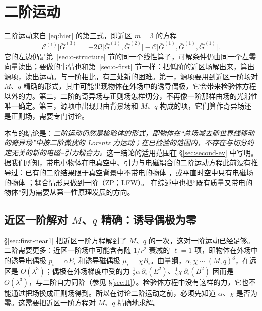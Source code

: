 \documentclass[11pt,a4paper]{ctexart}
\begin{document}
\section{二阶运动}\label{sec:o-second}

二阶运动来自 \eqref{eq:hier} 的第三式，即近区 $m=3$ 的方程
\begin{equation*}
\mathcal E^{(1)}\big[\bar G^{(3)}\big]=-2\mathcal Q\big[\bar G^{(1)},\bar G^{(2)}\big]-\mathcal C\big[\bar G^{(1)},\bar G^{(1)},\bar G^{(1)}\big].
\end{equation*}
它的左边仍是第~\ref{sec:o-structure} 节的同一个线性算子，可解条件仍由同一个左零向量读出；要做的事情也和第~\ref{sec:o-first} 节一样：把低阶的近区场解出来，算出源项，读出运动。与一阶相比，有三处新的困难。第一，源项要用到近区一阶场对 $M$、$q$ 精确的形式，其中可能出现物体在外场中的诱导偶极，它会带来检验体方程以外的力。第二，二阶的奇异场与正则场怎样切分，不再像一阶那样由场的光滑性唯一确定。第三，源项中出现只由背景场和 $M$、$q$ 构成的项，它们算作奇异场还是正则场，需要专门讨论。

本节的结论是：\emph{二阶运动仍然是检验体的形式，即物体在“总场减去随世界线移动的奇异场”中按二阶微扰的 Lorentz 力运动；在已检验的范围内，不存在与切分约定无关的新的电磁--引力耦合力。}这一结论的适用范围在 \S\ref{sec:second-ev} 中写明。据我们所知，带电小物体在电真空中、引力与电磁耦合的二阶运动方程此前没有推导过：已有的二阶结果限于真空背景中不带电的物体 \citep{Pound2012,Gralla2012,Pound2017}，或平直时空中只有电磁场的物体 \citep{MoxonFlanagan2018}；耦合情形只做到一阶（ZP；LFW）。\citet{BarackPound2019} 在综述中也把“既有质量又带电的物体”列为需要从第一性原理发展的方向。

\subsection{近区一阶解对 $M$、$q$ 精确：诱导偶极为零}\label{sec:o-dipole}

\S\ref{sec:first-near1} 把近区一阶方程解到了 $M$、$q$ 的一次，这对一阶运动已经足够。二阶需要更多：近区一阶场中可能含有随 $1/\bar r^2$ 衰减的 $\ell=1$ 项，即物体在外场中的诱导电偶极 $p_i=\alpha E_i$ 和诱导磁偶极 $\mu_i=\chi B_i$。由量纲，$\alpha,\chi\sim(M,q)^3$，在远区是 $O(\lambda^3)$；偶极在外场梯度中受的力 $\tfrac12\alpha\,\partial_i(E^2)$、$\tfrac12\chi\,\partial_i(B^2)$ 因而是 $O(\lambda^3)$，与二阶自力同阶（参见 \S\ref{sec:H}）。检验体方程中没有这样的力，它也不能通过把场换成正则场得到。所以在讨论二阶运动之前，必须先知道 $\alpha$、$\chi$ 是否为零。这需要把近区一阶方程对 $M$、$q$ 精确地求解。
\end{document}
